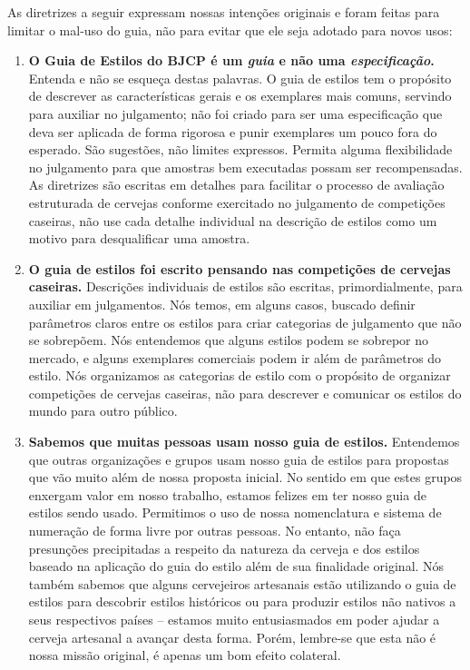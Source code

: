 As diretrizes a seguir expressam nossas intenções originais e foram feitas para limitar o mal-uso do guia, não para evitar que ele seja adotado para novos usos:
\begin{enumerate}
\item \textbf{O Guia de Estilos do BJCP é um \textit{guia} e não uma \textit{especificação}.} Entenda e não se esqueça destas palavras. O guia de estilos tem o propósito de descrever as características gerais e os exemplares mais comuns, servindo para auxiliar no julgamento; não foi criado para ser uma especificação que deva ser aplicada de forma rigorosa e punir exemplares um pouco fora do esperado. São sugestões, não limites expressos. Permita alguma flexibilidade no julgamento para que amostras bem executadas possam ser recompensadas. As diretrizes são escritas em detalhes para facilitar o processo de avaliação estruturada de cervejas conforme exercitado no julgamento de competições caseiras, não use cada detalhe individual na descrição de estilos como um motivo para desqualificar uma amostra.
\item \textbf{O guia de estilos foi escrito pensando nas competições de cervejas caseiras.} Descrições individuais de estilos são escritas, primordialmente, para auxiliar em julgamentos. Nós temos, em alguns casos, buscado definir parâmetros claros entre os estilos para criar categorias de julgamento que não se sobrepõem. Nós entendemos que alguns estilos podem se sobrepor no mercado, e alguns exemplares comerciais podem ir além de parâmetros do estilo. Nós organizamos as categorias de estilo com o propósito de organizar competições de cervejas caseiras, não para descrever e comunicar os estilos do mundo para outro público.
\item \textbf{Sabemos que muitas pessoas usam nosso guia de estilos.} Entendemos que outras organizações e grupos usam nosso guia de estilos para propostas que vão muito além de nossa proposta inicial. No sentido em que estes grupos enxergam valor em nosso trabalho, estamos felizes em ter nosso guia de estilos sendo usado. Permitimos o uso de nossa nomenclatura e sistema de numeração de forma livre por outras pessoas. No entanto, não faça presunções precipitadas a respeito da natureza da cerveja e dos estilos baseado na aplicação do guia do estilo além de sua finalidade original. Nós também sabemos que alguns cervejeiros artesanais estão utilizando o guia de estilos para descobrir estilos históricos ou para produzir estilos não nativos a seus respectivos países – estamos muito entusiasmados em poder ajudar a cerveja artesanal a avançar desta forma. Porém, lembre-se que esta não é nossa missão original, é apenas um bom efeito colateral.

\end{enumerate}

